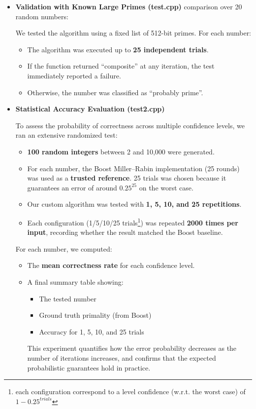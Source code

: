 \documentclass{article}
\begin{document}
\begin{itemize}
    \item \textbf{Validation with Known Large Primes (test.cpp)} comparison over 20 random numbers:

    We tested the algorithm using a fixed list of 512-bit primes.
    For each number:
    \begin{itemize}
        \item The algorithm was executed up to \textbf{25 independent trials}.
        \item If the function returned “composite” at any iteration, the test immediately reported a failure.
        \item Otherwise, the number was classified as “probably prime”.
    \end{itemize}
    
    \item \textbf{Statistical Accuracy Evaluation (test2.cpp)}
    
    To assess the probability of correctness across multiple confidence levels, we ran an extensive randomized test:
    \begin{itemize}
        \item \textbf{100 random integers} between 2 and 10,000 were generated.
        \item For each number, the Boost Miller–Rabin implementation (25 rounds) was used as a \textbf{trusted reference}. 25 trials was chosen because it guarantees an error of around $0.25^{25}$ on the worst case.
        \item Our custom algorithm was tested with \textbf{1, 5, 10, and 25 repetitions}.
        \item Each configuration (1/5/10/25 trials\footnote{each configuration correspond to a level confidence (w.r.t. the worst case) of $1-0.25^{trials}$}) was repeated \textbf{2000 times per input}, recording whether the result matched the Boost baseline.
    \end{itemize}
    For each number, we computed:
    \begin{itemize}
        \item The \textbf{mean correctness rate} for each confidence level.
        \item A final summary table showing:
        \begin{itemize}
            \item The tested number
            \item Ground truth primality (from Boost)
            \item Accuracy for 1, 5, 10, and 25 trials
        \end{itemize}

        This experiment quantifies how the error probability decreases as the number of iterations increases, and confirms that the expected probabilistic guarantees hold in practice.
        
    \end{itemize}
\end{itemize}
\end{document}
